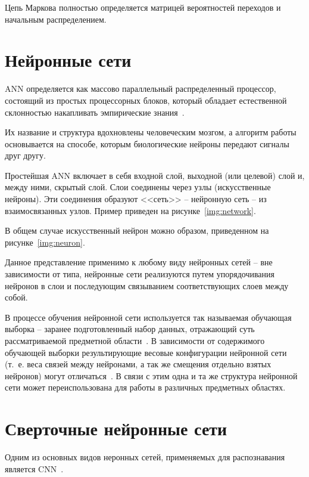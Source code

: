 Цепь Маркова полностью определяется матрицей вероятностей переходов и начальным распределением.

\section{Нейронные сети}

ANN определяется как массово параллельный распределенный процессор, состоящий из простых процессорных блоков, который обладает естественной склонностью накапливать эмпирические знания~\cite{ann}. 

Их название и структура вдохновлены человеческим мозгом, а алгоритм работы основывается на способе, которым биологические нейроны передают сигналы друг другу.

Простейшая ANN включает в себя входной слой, выходной (или целевой) слой и, между ними, скрытый слой. Слои соединены через узлы (искусственные нейроны). Эти соединения образуют <<сеть>> -- нейронную сеть -- из взаимосвязанных узлов. Пример приведен на рисунке~\ref{img:network}.


В общем случае искусственный нейрон можно образом, приведенном на рисунке~\ref{img:neuron}.


Данное представление применимо к любому виду нейронных сетей -- вне зависимости от типа, нейронные сети реализуются путем упорядочивания нейронов в слои и последующим связыванием соответствующих слоев между собой.~\cite{ann}

В процессе обучения нейронной сети используется так называемая обучающая выборка -- заранее подготовленный набор данных, отражающий суть рассматриваемой предметной области~\cite{ann}. В зависимости от содержимого обучающей выборки результирующие весовые конфигурации нейронной сети (т.~е. веса связей между нейронами, а так же смещения отдельно взятых нейронов) могут отличаться~\cite{ann}. В связи с этим одна и та же структура нейронной сети может переиспользована для работы в различных предметных областях.

\section{Сверточные нейронные сети}

Одним из основных видов неронных сетей, применяемых для распознавания является CNN~\cite{cnn}.


